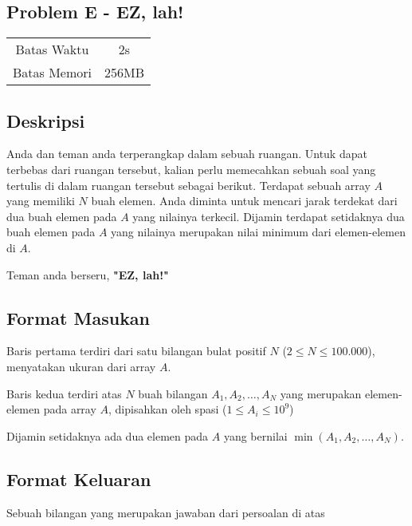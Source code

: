 \documentclass{article}
\begin{document}
\begin{center}
    \section*{Problem E - EZ, lah!} %

    \begin{tabular}{ | c c | }
        \hline
        Batas Waktu  & 2s \\    %
        Batas Memori & 256MB \\  %
        \hline
    \end{tabular}
\end{center}

\subsection*{Deskripsi}

Anda dan teman anda terperangkap dalam sebuah ruangan. Untuk dapat terbebas dari ruangan tersebut, kalian perlu memecahkan sebuah soal yang tertulis di dalam ruangan tersebut sebagai berikut. Terdapat sebuah array $A$ yang memiliki $N$ buah elemen. Anda diminta untuk mencari jarak terdekat dari dua buah elemen pada $A$ yang nilainya terkecil. Dijamin terdapat setidaknya dua buah elemen pada $A$ yang nilainya merupakan nilai minimum dari elemen-elemen di $A$.

Teman anda berseru, \textbf{"EZ, lah!"}

\subsection*{Format Masukan}

Baris pertama terdiri dari satu bilangan bulat positif $N$ ($2 \leq N \leq 100.000$), menyatakan ukuran dari array $A$.

Baris kedua terdiri atas $N$ buah bilangan $A_1, A_2, \dots, A_N$ yang merupakan elemen-elemen pada array $A$, dipisahkan oleh spasi ($1 \leq A_i \leq 10^9$)

Dijamin setidaknya ada dua elemen pada $A$ yang bernilai $\min(A_1, A_2, \dots, A_N)$.

\subsection*{Format Keluaran}

Sebuah bilangan yang merupakan jawaban dari persoalan di atas
\\
\end{document}
